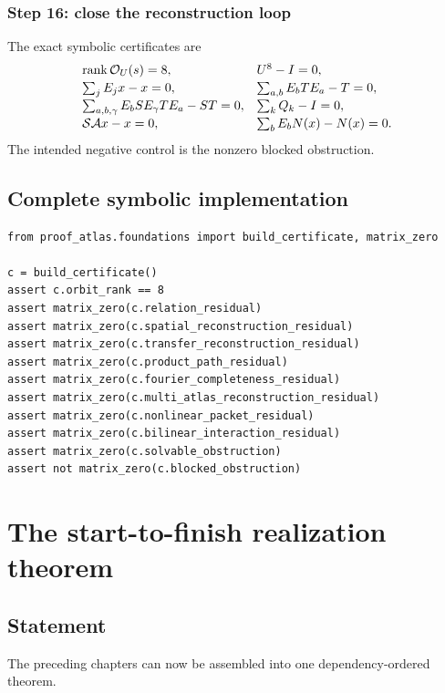 \subsection{Step 16: close the reconstruction loop}
The exact symbolic certificates are
\[
\begin{array}{ll}
\operatorname{rank}\mathcal O_U(s)=8,&U^8-I=0,\\[2pt]
\sum_jE_jx-x=0,&\sum_{a,b}E_bTE_a-T=0,\\[2pt]
\sum_{a,b,\gamma}E_bSE_\gamma TE_a-ST=0,&\sum_kQ_k-I=0,\\[2pt]
\mathcal S\mathcal A x-x=0,&\sum_bE_bN(x)-N(x)=0.
\end{array}
\]
The intended negative control is the nonzero blocked obstruction.


\section{Complete symbolic implementation}
\begin{lstlisting}
from proof_atlas.foundations import build_certificate, matrix_zero

c = build_certificate()
assert c.orbit_rank == 8
assert matrix_zero(c.relation_residual)
assert matrix_zero(c.spatial_reconstruction_residual)
assert matrix_zero(c.transfer_reconstruction_residual)
assert matrix_zero(c.product_path_residual)
assert matrix_zero(c.fourier_completeness_residual)
assert matrix_zero(c.multi_atlas_reconstruction_residual)
assert matrix_zero(c.nonlinear_packet_residual)
assert matrix_zero(c.bilinear_interaction_residual)
assert matrix_zero(c.solvable_obstruction)
assert not matrix_zero(c.blocked_obstruction)
\end{lstlisting}

\chapter{The start-to-finish realization theorem}\label{ch:start-finish-theorem}

\section{Statement}
The preceding chapters can now be assembled into one dependency-ordered theorem.

